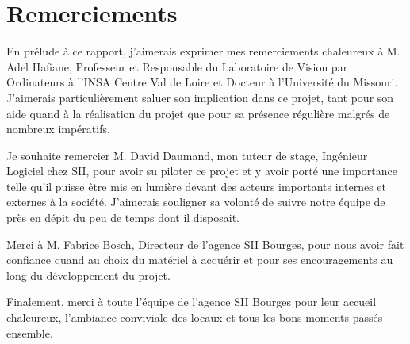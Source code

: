 \section*{Remerciements}
{
	En prélude à ce rapport, j'aimerais exprimer mes remerciements chaleureux à M. Adel Hafiane, Professeur et Responsable du Laboratoire de Vision par Ordinateurs à l'INSA Centre Val de Loire et Docteur à l'Université du Missouri. J'aimerais particulièrement saluer son implication dans ce projet, tant pour son aide quand à la réalisation du projet que pour sa présence régulière malgrés de nombreux impératifs.
	\par
	Je souhaite remercier M. David Daumand, mon tuteur de stage, Ingénieur Logiciel chez SII, pour avoir su piloter ce projet et y avoir porté une importance telle qu'il puisse être mis en lumière devant des acteurs importants internes et externes à la société. J'aimerais souligner sa volonté de suivre notre équipe de près en dépit du peu de temps dont il disposait.
	\par
	Merci à M. Fabrice Bosch, Directeur de l'agence SII Bourges, pour nous avoir fait confiance quand au choix du matériel à acquérir et pour ses encouragements au long du développement du projet.
	\par
	Finalement, merci à toute l'équipe de l'agence SII Bourges pour leur accueil chaleureux, l'ambiance conviviale des locaux et tous les bons moments passés ensemble.
}
